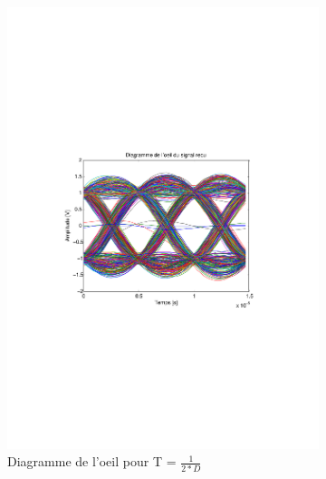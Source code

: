 \documentclass[a4paper,11pt]{article}
\begin{document}
\begin{figure}
	\begin{subfigure}{.5\textwidth}
  		\centering
  		\includegraphics[width=1\linewidth]{Q10-Tsur2.pdf}
  		\caption{Diagramme de l'oeil pour T = $\frac{1}{2*D}$}
  		\label{fig:q10t2}
	\end{subfigure}
	\begin{subfigure}{.5\textwidth}
  		\centering

\end{subfigure}
\end{figure}
\end{document}
